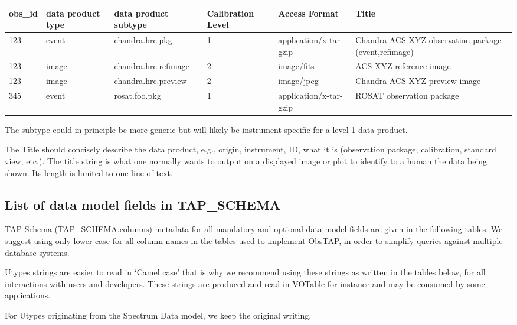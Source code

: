 \documentclass[11pt,a4paper]{ivoa}
\begin{document}
\vspace{0.3cm}
\noindent
\scriptsize
\begin{tabular}{|p{}|p{}|p{}|p{}|p{}|p{}|}
\hline
obs\_id & data product type & data product subtype   & Calibration Level   & Access Format   & Title\\\hline
123   & event   & chandra.hrc.pkg   & 1 & application/x-tar-gzip   & Chandra ACS-XYZ observation package (event,refimage)\\\hline
123   & image   & chandra.hrc.refimage   & 2 & image/fits   & ACS-XYZ reference image\\\hline
123   & image   & chandra.hrc.preview   & 2 & image/jpeg   & Chandra ACS-XYZ preview image\\\hline
345   & event   & rosat.foo.pkg   & 1 & application/x-tar-gzip & ROSAT observation package\\\hline
\end{tabular}
\vspace{0.3cm}
\normalsize


The subtype could in principle be more generic but will likely be instrument-specific for a level 1 data product.

The Title should concisely describe the data product, e.g., origin, instrument, ID, what it is (observation package,
calibration, standard view, etc.).  The title string is what one normally wants to output on a displayed image or plot
to identify to a human the data being shown. Its length is limited to one line of text.

\subsection[List of data model fields in TAP\_SCHEMA]{List of data model fields in TAP\_SCHEMA}
TAP Schema (TAP\_SCHEMA.columns) metadata for all mandatory and optional data model fields are given in the following
tables.  We suggest using only lower case for all column names in the tables used to implement ObsTAP, in order to
simplify queries against multiple database systems.

Utypes strings are easier to read in `Camel case' that is why we recommend using these strings as written in the tables
below, for all interactions with users and developers. These strings are produced and read in VOTable for instance and
may be consumed by some applications.

For Utypes originating from the Spectrum Data model, we keep the original writing.
\end{document}
